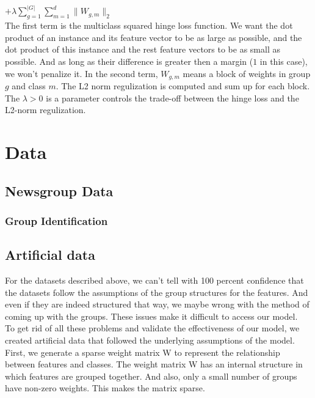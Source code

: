 \documentclass[11pt]{article}
\begin{document}
$ + \lambda \sum_{g=1}^{|G|} \sum_{m=1}^{d} \| W_{g,m} \|_2$ \\

The first term is the multiclass squared hinge loss function. We want the dot product of an instance and its feature vector to be as large as possible, and the dot product of this instance and the rest feature vectors to be as small as possible. And as long as their difference is greater then a margin ($1$ in this case), we won't penalize it. In the second term, $W_{g,m}$ means a block of weights in group $g$ and class $m$. The L2 norm regulization is computed and sum up for each block. The $\lambda > 0$ is a parameter controls the trade-off between the hinge loss and the L2-norm regulization.  \\



\section{Data}

\subsection{Newsgroup Data}

\subsubsection{Group Identification}

\subsection{Artificial data}

For the datasets described above, we can't tell with 100 percent confidence that the datasets follow the assumptions of the group structures for the features. And even if they are indeed structured that way, we maybe wrong with the method of coming up with the groups. These issues make it difficult to access our model.\\ 

To get rid of all these problems and validate the effectiveness of our model, we created artificial data that followed the underlying assumptions of the model. First, we generate a sparse weight matrix W to represent the relationship between features and classes. The weight matrix W has an internal structure in which features are grouped together. And also, only a small number of groups have non-zero weights. This makes the matrix sparse.\\ 
\end{document}
